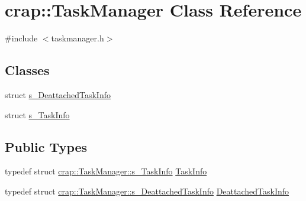 \hypertarget{classcrap_1_1_task_manager}{}\section{crap\+:\+:Task\+Manager Class Reference}
\label{classcrap_1_1_task_manager}


{\ttfamily \#include $<$taskmanager.\+h$>$}

\subsection*{Classes}
\begin{DoxyCompactItemize}
\item 
struct \hyperlink{structcrap_1_1_task_manager_1_1s___deattached_task_info}{s\+\_\+\+Deattached\+Task\+Info}
\item 
struct \hyperlink{structcrap_1_1_task_manager_1_1s___task_info}{s\+\_\+\+Task\+Info}
\end{DoxyCompactItemize}
\subsection*{Public Types}
\begin{DoxyCompactItemize}
\item 
typedef struct \hyperlink{structcrap_1_1_task_manager_1_1s___task_info}{crap\+::\+Task\+Manager\+::s\+\_\+\+Task\+Info} \hyperlink{classcrap_1_1_task_manager_a298a79f168fc914a5a8a98f87bb193ad}{Task\+Info}
\item 
typedef struct \hyperlink{structcrap_1_1_task_manager_1_1s___deattached_task_info}{crap\+::\+Task\+Manager\+::s\+\_\+\+Deattached\+Task\+Info} \hyperlink{classcrap_1_1_task_manager_a4be4696ce3c01594fb82cc142de21e4c}{Deattached\+Task\+Info}
\end{DoxyCompactItemize}

